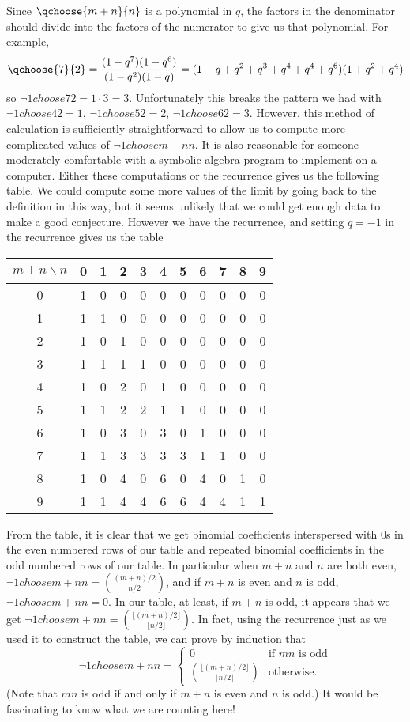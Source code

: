\begin{enumerate}
{Since $\qchoose{m+n}{n}$ is a polynomial in $q$, the factors in the denominator
should divide into the factors of the numerator to give us that polynomial. 
For example,
$$\qchoose{7}{2}={(1-q^7)(1-q^6)\over(1-q^2)(1-q)} =(1+q+q^2+q^3+q^4+q^4+q^6)
(1+q^2+q^4)$$
so $\neg1choose{7}{2}=1\cdot3=3$.  Unfortunately this breaks the pattern we had
with $\neg1choose{4}{2}=1$, $\neg1choose{5}{2}=2$, $\neg1choose{6}{2}=3$. 
However, this method of calculation is sufficiently straightforward to allow us
to compute more complicated values of $\neg1choose{m+n}{n}$.  It is also
reasonable for someone moderately comfortable with a symbolic algebra program
to implement on a computer.   Either these computations or the recurrence gives
us the following table.\fi
We could compute some more values of the limit  by going back to the
definition in this way, but it seems unlikely that we could get enough data to
make a good conjecture.  However we have the recurrence, and setting
$q=-1$ in the recurrence gives us the table

\begin{tabular}{c|c|c|c|c|c|c|c|c|c|c}
$m+n\backslash n$&0&1&2&3&4&5&6&7&8&9\\
\hline
0&1&0&0&0&0&0&0&0&0&0\\
1&1&1&0&0&0&0&0&0&0&0\\
2&1&0&1&0&0&0&0&0&0&0\\
3&1&1&1&1&0&0&0&0&0&0\\
4&1&0&2&0&1&0&0&0&0&0\\
5&1&1&2&2&1&1&0&0&0&0\\
6&1&0&3&0&3&0&1&0&0&0\\
7&1&1&3&3&3&3&1&1&0&0\\
8&1&0&4&0&6&0&4&0&1&0\\
9&1&1&4&4&6&6&4&4&1&1
\end{tabular}

From the table, it is clear that we get binomial coefficients interspersed with
0s in the even numbered rows of our table and repeated binomial coefficients in
the odd numbered rows of our table.  In particular when $m+n$ and $n$ are both
even, $\neg1choose{m+n}{n}={(m+n)/2\choose n/2}$, and if $m+n$ is even and $n$
is odd, $\neg1choose{m+n}{n}=0$.  In our table, at least, if $m+n$ is odd, it
appears that we get $\neg1choose{m+n}{n}={\lfloor(m+n)/2\rfloor\choose
\lfloor n/2\rfloor}$.  In fact, using the recurrence just as we used it to
construct the table, we can prove by induction that
$$\neg1choose{m+n}{n}=\left\{ 
\begin{array}{ll}0&\mbox{if $mn$ is odd}\\
{\lfloor(m+n)/2\rfloor\choose
\lfloor n/2\rfloor}&\mbox{otherwise.}
\end{array}\right.$$
(Note that $mn$ is odd if and only if $m+n$ is even and $n$ is odd.)  It would
be fascinating to know what we are counting here!}


\end{enumerate}
